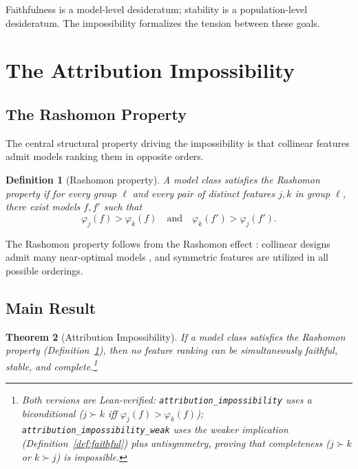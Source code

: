 \documentclass{article}
\newtheorem{theorem}{Theorem}
\newtheorem{definition}[theorem]{Definition}
\begin{document}
Faithfulness is a model-level desideratum; stability is a population-level desideratum. The impossibility formalizes the tension between these goals.

\section{The Attribution Impossibility}
\label{sec:impossibility}

\subsection{The Rashomon Property}
\label{sec:rashomon}

The central structural property driving the impossibility is that collinear features admit models ranking them in opposite orders.

\begin{definition}[Rashomon property]
\label{def:rashomon}
A model class satisfies the \emph{Rashomon property} if for every group $\ell$ and every pair of distinct features $j, k$ in group $\ell$, there exist models $f, f'$ such that
\[
    \varphi_j(f) > \varphi_k(f) \quad \text{and} \quad \varphi_k(f') > \varphi_j(f').
\]
\end{definition}

The Rashomon property follows from the Rashomon effect \citep{rudin2024amazing,fisher2019models}: collinear designs admit many near-optimal models \citep{damour2022underspecification}, and symmetric features are utilized in all possible orderings.

\subsection{Main Result}
\label{sec:main-result}

\begin{theorem}[Attribution Impossibility]
\label{thm:impossibility}
If a model class satisfies the Rashomon property (Definition~\ref{def:rashomon}), then no feature ranking can be simultaneously faithful, stable, and complete.\footnote{Both versions are Lean-verified: \texttt{attribution\_impossibility} uses a biconditional ($j \succ k$ iff $\varphi_j(f) > \varphi_k(f)$); \texttt{attribution\_impossibility\_weak} uses the weaker implication (Definition~\ref{def:faithful}) plus antisymmetry, proving that completeness ($j \succ k$ or $k \succ j$) is impossible.}
\end{theorem}
\end{document}
